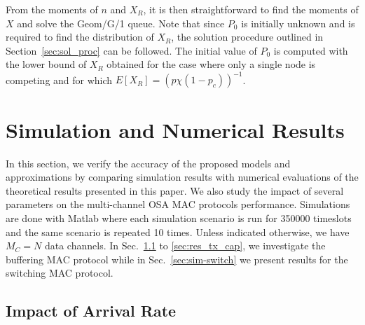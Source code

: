 \documentclass[12pt,journal,oneside,onecolumn]{IEEEtran}
\begin{document}
From the moments of $n$ and $X_R$, it is then straightforward to find the moments of $X$ and solve the Geom/G/1 queue.
Note that since $P_0$ is initially unknown and is required to find the distribution of $X_R$, the solution
procedure outlined in Section~\ref{sec:sol_proc} can be followed. The initial value of $P_0$ is computed with the lower bound of $X_R$ obtained for the case where only a
single node is competing and for which $E[X_{R}] = (p \chi(1-p_c))^{-1}$.


\section{Simulation and Numerical Results}
\label{sec:simulation}

In this section, we verify the accuracy of the proposed 
models and approximations by comparing simulation results with numerical evaluations
of the theoretical results presented in this paper. We also study the impact of several parameters on the
multi-channel OSA MAC protocols performance.
Simulations are done with Matlab where each simulation scenario is 
run for 350000 timeslots and the same scenario is repeated 10 times.
Unless indicated otherwise, we have $M_C=N$ data channels. In Sec.~\ref{sec:res_arr_rate} to \ref{sec:res_tx_cap}, we investigate
the buffering MAC protocol while in Sec.~\ref{sec:sim-switch} we present results for the switching MAC protocol.

\subsection{Impact of Arrival Rate}
\label{sec:res_arr_rate}
\end{document}
